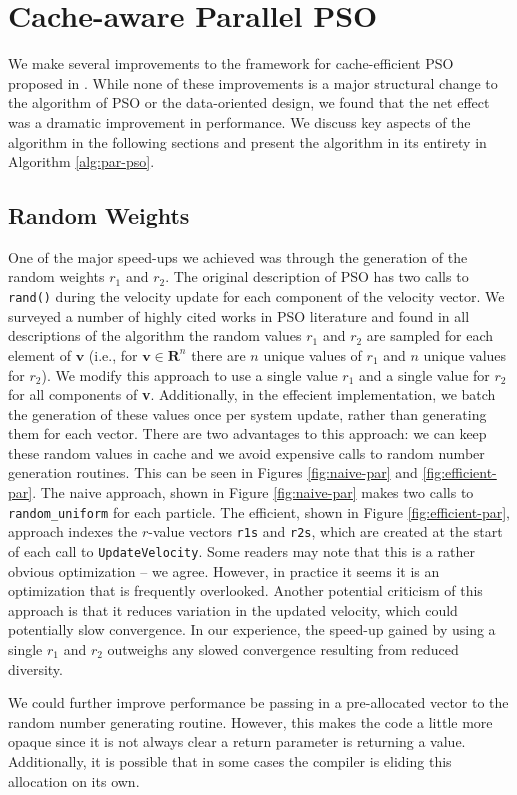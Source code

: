 \section{Cache-aware Parallel PSO}\label{sec:algo}
We make several improvements to the framework for cache-efficient PSO proposed
in \cite{cache-pso}. While none of these improvements is a major structural
change to the algorithm of PSO or the data-oriented design, we found that the
net effect was a dramatic improvement in performance. We discuss key aspects of
the algorithm in the following sections and present the algorithm in its
entirety in Algorithm \ref{alg:par-pso}.

\subsection{Random Weights}
One of the major speed-ups we achieved was through
the generation of the random weights $r_1$ and $r_2$. The original description of
PSO \cite{pso} has two calls to \texttt{rand()} during the velocity update for each
component of the velocity vector. We surveyed a number of highly cited works in
PSO literature \cite{pso-development, pso-overview, pso-tutorial} and found in
all descriptions of the algorithm the random values $r_1$ and $r_2$ are sampled
for each element of $\textbf{v}$ (i.e., for $\textbf{v}\in\mathbf{R}^n$ there
are $n$ unique values of $r_1$ and $n$ unique values for $r_2$). We modify this
approach to use a single value $r_1$ and a single value for $r_2$ for all
components of \textbf{v}. Additionally, in the effecient implementation, we batch
the generation of these values once per system update, rather than generating
them for each vector.
There are two advantages to this approach: we can keep
these random values in cache and we avoid expensive calls to random number
generation routines. This can be seen in Figures \ref{fig:naive-par} and
\ref{fig:efficient-par}. The naive approach, shown in Figure \ref{fig:naive-par}
makes two calls to
\texttt{random\_uniform} for each particle. The efficient, shown in Figure
\ref{fig:efficient-par},
approach indexes the $r$-value vectors \texttt{r1s} and \texttt{r2s}, which are
created at the start of each call to \texttt{UpdateVelocity}. Some readers may
note that this is a rather obvious optimization -- we agree. However, in
practice it seems it is an optimization that is frequently overlooked.
Another potential criticism of this approach is that it reduces variation in the
updated velocity, which could potentially slow convergence. In our experience,
the speed-up gained by using a single $r_1$ and $r_2$ outweighs any slowed
convergence resulting from reduced diversity.\par
We could further improve performance be passing in a pre-allocated vector to the
random number generating routine. However, this makes the code a little more
opaque since it is not always clear a return parameter is returning a
value. Additionally, it is possible that in some cases the compiler is eliding
this allocation on its own.

